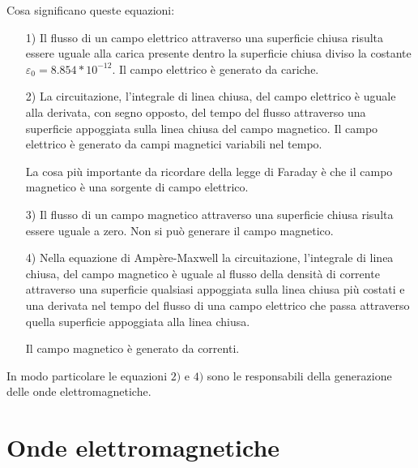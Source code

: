 Cosa significano queste equazioni:

\begin{itemize}
    \item[1)] Il flusso di un campo elettrico attraverso una superficie chiusa risulta essere uguale alla carica presente dentro la superficie chiusa diviso la costante $\varepsilon_0 = 8.854*10^{-12}$. Il campo elettrico è generato da cariche.

    \item[2)] La circuitazione, l'integrale di linea chiusa, del campo elettrico è uguale alla derivata, con segno opposto, del tempo del flusso attraverso una superficie appoggiata sulla linea chiusa del campo magnetico.
    Il campo elettrico è generato da campi magnetici variabili nel tempo.

    La cosa più importante da ricordare della legge di Faraday è che il campo magnetico è una sorgente di campo elettrico.
    

    
    \item[3)] Il flusso di un campo magnetico attraverso una superficie chiusa risulta essere uguale a zero.
    Non si può generare il campo magnetico.

    \item[4)] Nella equazione di Ampère-Maxwell la circuitazione, l'integrale di linea chiusa, del campo magnetico è uguale al flusso  della densità di corrente attraverso una superficie qualsiasi appoggiata sulla linea chiusa più costati e una derivata nel tempo del flusso di una campo elettrico che passa attraverso quella superficie appoggiata alla linea chiusa.
    
    Il campo magnetico è generato da correnti.
\end{itemize}

In modo particolare le equazioni $2)$ e $4)$ sono le responsabili della generazione delle onde elettromagnetiche.

\newpage
\section{Onde elettromagnetiche}

